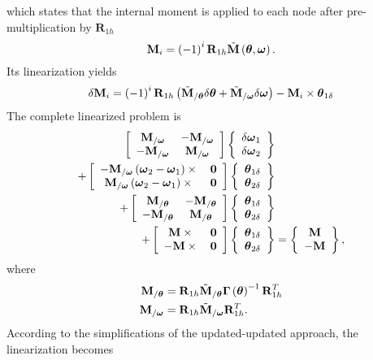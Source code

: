 \documentclass[10pt,dvips,fleqn,subeqn]{report}
\newcommand{\T}[1]{\bm{\mathbf{#1}}}
\begin{document}
which states that the internal moment is applied to each node 
after pre-multiplication by $\T{R}_{1h}$
\begin{equation}
	\T{M}_i = \plbr{-1}^i \T{R}_{1h} \tilde{\T{M}}\plbr{\T{\theta}, \T{\omega}} .
\end{equation}
Its linearization yields
\begin{equation}
	\delta\T{M}_i = \plbr{-1}^i \T{R}_{1h} \plbr{
		\tilde{\T{M}}_{/\T{\theta}} \delta \T{\theta}
		+ \tilde{\T{M}}_{/\T{\omega}} \delta\T{\omega}
	} - \T{M}_i \times \T{\theta}_{1\delta}
\end{equation}
The complete linearized problem is
\begin{align}
	\sqbr{\matr{cc}{
		\T{M}_{/\T{\omega}} & - \T{M}_{/\T{\omega}} \\
		- \T{M}_{/\T{\omega}} & \T{M}_{/\T{\omega}}
	}}\cubr{\cvvect{
		\delta\T{\omega}_1 \\
		\delta\T{\omega}_2
	}} & \nonumber \\
	+ \sqbr{\matr{cc}{
		- \T{M}_{/\T{\omega}} \plbr{\T{\omega}_2 - \T{\omega}_1}\times{} & \T{0} \\
		\T{M}_{/\T{\omega}} \plbr{\T{\omega}_2 - \T{\omega}_1}\times{} & \T{0}
	}} \cubr{\cvvect{
		\T{\theta}_{1\delta} \\
		\T{\theta}_{2\delta}
	}} & \nonumber \\
	+ \sqbr{\matr{cc}{
		\T{M}_{/\T{\theta}} & - \T{M}_{/\T{\theta}} \\
		- \T{M}_{/\T{\theta}} & \T{M}_{/\T{\theta}}
	}} \cubr{\cvvect{
		\T{\theta}_{1\delta} \\
		\T{\theta}_{2\delta}
	}} & \nonumber \\
	+ \sqbr{\matr{cc}{
		\T{M}\times{} & \T{0} \\
		- \T{M}\times{} & \T{0}
	}} \cubr{\cvvect{
		\T{\theta}_{1\delta} \\
		\T{\theta}_{2\delta}
	}} &= \cubr{\cvvect{
		\T{M} \\
		- \T{M}
	}} ,
\end{align}
where
\begin{subequations}
\begin{align}
	\T{M}_{/\T{\theta}} &= \T{R}_{1h} \tilde{\T{M}}_{/\T{\theta}} \T{\Gamma}\plbr{\T{\theta}}^{-1} \T{R}_{1h}^T \\
	\T{M}_{/\T{\omega}} &= \T{R}_{1h} \tilde{\T{M}}_{/\T{\omega}} \T{R}_{1h}^T .
\end{align}
\end{subequations}
According to the simplifications of the updated-updated approach, the linearization becomes
\end{document}
